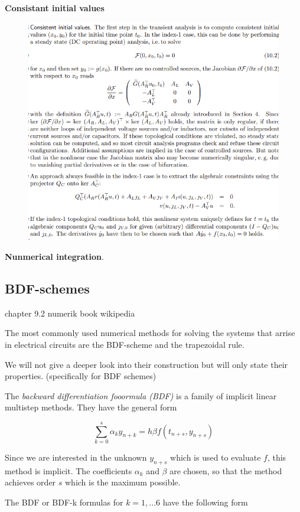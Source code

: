 \textbf{Consistant initial values} 
\begin{figure}[H]
	\centering
	\includegraphics[width=0.7\linewidth]{screenshot009}
	\caption{}
	\label{fig:screenshot009}
\end{figure}

\textbf{Nunmerical integration}.


\subsection{BDF-schemes}
	chapter 9.2 numerik book
	wikipedia
	
	The most commonly used numerical methods for solving the systems that arrise in electrical circuits are the BDF-scheme and the trapezoidal rule. 
	
	We will not give a deeper look into their construction but will only state their properties. (specifically for BDF schemes)
	
	The \emph{backward differentiation fooormula (BDF)} is a family of implicit linear multistep methods. They have the general form
	
	\begin{equation}
		\sum_{k=0}^{s} \alpha_k y_{n+k} = h \beta f(t_{n+s}, y_{n+s})
	\end{equation}

	Since we are interested in the unknown $y_{n+s}$ which is used to evaluate $f$, this method is implicit. The coefficients $\alpha_k$ and $\beta$ are chosen, so that the method achieves order $s$ which is the maximum possible.
	
	The BDF or BDF-k formulas for $k=1,...6$ have the following form
	
